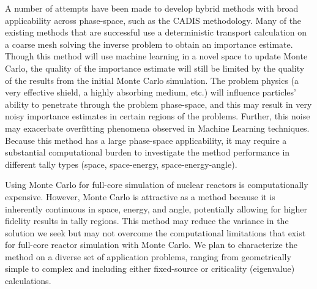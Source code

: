 \documentclass[letterpaper,12pt]{article}
\begin{document}

A number of attempts have been made to develop hybrid methods with broad
applicability across phase-space, such as the CADIS
methodology\cite{haghighat_monte_2003}. Many of the
existing methods that are successful use a deterministic transport
calculation on a coarse mesh solving the inverse problem to obtain an importance
estimate\cite{zhang_global_2014, zhang_adjoint-based_2011, haghighat_monte_2003,
hendricks_mcnp_1985}. Though this method will use machine learning in a novel space to
update Monte Carlo, the quality of the importance estimate will still be limited
by the quality of the results from the initial Monte Carlo simulation. The
problem physics (a very effective shield, a highly absorbing medium, etc.) will
influence particles' ability to penetrate through the problem phase-space, and
this may result in very noisy importance estimates in certain regions of the
problems\cite{van_wijk_easy_2011}. Further, this noise may exacerbate overfitting phenomena observed in
Machine Learning techniques. Because this method has a large phase-space
applicability, it may require a substantial computational burden to investigate
the method performance in different tally types (space, space-energy,
space-energy-angle).

Using Monte Carlo for full-core simulation of nuclear reactors is
computationally expensive\cite{martin_challenges_2012}. However, Monte Carlo is
attractive as a method because it is inherently continuous in space, energy, and
angle, potentially allowing for higher fidelity results in tally regions.
This method may reduce
the variance in the solution we seek but may not overcome the computational
limitations that exist for full-core reactor simulation with Monte Carlo. We plan to
characterize the method on a diverse set of application problems, ranging from
geometrically simple to complex and including either fixed-source or criticality
(eigenvalue) calculations.
\end{document}

